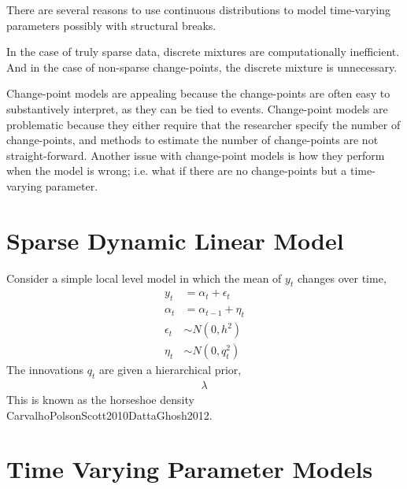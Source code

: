 \documentclass{article}
\begin{document}
There are several reasons to use continuous distributions to model time-varying parameters possibly with structural breaks.

In the case of truly sparse data, discrete mixtures are computationally inefficient. 
And in the case of non-sparse change-points, the discrete mixture is unnecessary.

Change-point models are appealing because the change-points are often easy to substantively interpret, as they can be tied to events.
Change-point models are problematic because they either require that the researcher specify the number of change-points, and methods to estimate the number of change-points are not straight-forward.
Another issue with change-point models is how they perform when the model is wrong; i.e. what if there are no change-points but a time-varying parameter.

\section{Sparse Dynamic Linear Model}

Consider a simple local level model in which the mean of $y_{t}$ changes over time,
\begin{align}
  \label{eq:8}
  y_t &= \alpha_t + \epsilon_t \\
  \alpha_t &= \alpha_{t-1} + \eta_{t} \\
  \epsilon_{t} &\sim N(0, h^{2}) \\
  \eta_{t} &\sim N(0, q_{t}^{2})
\end{align}
The innovations $q_{t}$ are given a hierarchical prior,
\begin{align}
  \label{eq:4}
  \lambda^{}
\end{align}
This is known as the horseshoe density \textcite{CarvalhoPolsonScott2009}{CarvalhoPolsonScott2010}{DattaGhosh2012}.


\section{Time Varying Parameter Models}
\label{sec:time-vary-param}

\end{document}
